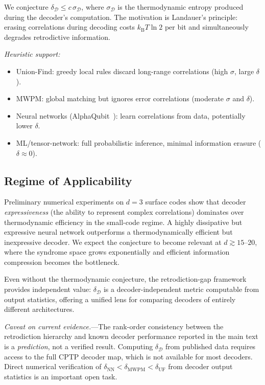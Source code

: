 \documentclass[prl,twocolumn,superscriptaddress,longbibliography]{revtex4-2}
\newcommand{\kB}{k_{\mathrm{B}}}
\begin{document}
We conjecture $\delta_{\mathcal{D}} \leq c\,\sigma_{\mathcal{D}}$,
where $\sigma_{\mathcal{D}}$ is the thermodynamic entropy produced
during the decoder's computation. The motivation is Landauer's
principle: erasing correlations during decoding costs
$\kB T \ln 2$ per bit and simultaneously degrades retrodictive
information.

\emph{Heuristic support:}
\begin{itemize}
\item Union-Find: greedy local rules discard long-range correlations
  (high $\sigma$, large $\delta$).
\item MWPM: global matching but ignores error correlations
  (moderate $\sigma$ and $\delta$).
\item Neural networks (AlphaQubit~\cite{Bausch2024}): learn
  correlations from data, potentially lower $\delta$.
\item ML/tensor-network: full probabilistic inference,
  minimal information erasure ($\delta \approx 0$).
\end{itemize}

\subsection{Regime of Applicability}

Preliminary numerical experiments on $d = 3$ surface codes show that
decoder \emph{expressiveness} (the ability to represent complex
correlations) dominates over thermodynamic efficiency in the small-code
regime. A highly dissipative but expressive neural network outperforms
a thermodynamically efficient but inexpressive decoder. We expect the
conjecture to become relevant at $d \gtrsim 15$--$20$, where the
syndrome space grows exponentially and efficient information
compression becomes the bottleneck.

Even without the thermodynamic conjecture, the retrodiction-gap
framework provides independent value: $\delta_{\mathcal{D}}$ is a
decoder-independent metric computable from output statistics,
offering a unified lens for comparing decoders of entirely different
architectures.

\emph{Caveat on current evidence.}---The rank-order consistency
between the retrodiction hierarchy and known decoder performance
reported in the main text is a \emph{prediction}, not a verified
result. Computing $\delta_{\mathcal{D}}$ from published data requires
access to the full CPTP decoder map, which is not available for most
decoders. Direct numerical verification of
$\delta_{\mathrm{NN}} < \delta_{\mathrm{MWPM}} < \delta_{\mathrm{UF}}$
from decoder output statistics is an important open task.
\end{document}
